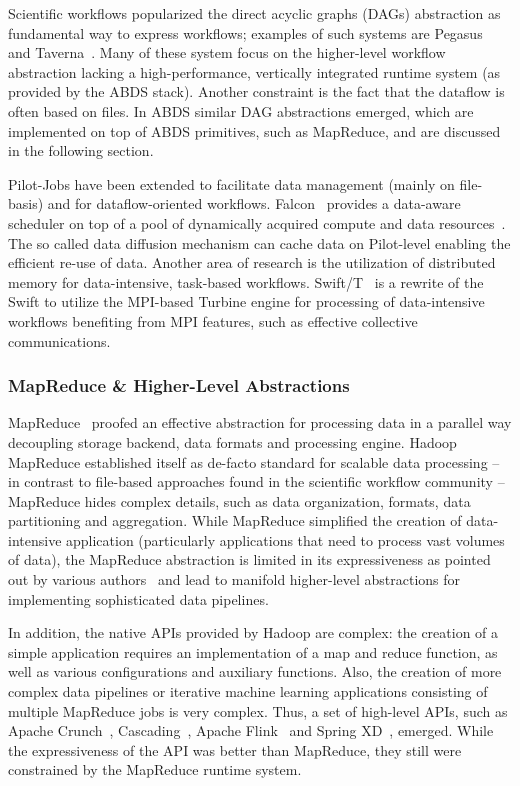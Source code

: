\documentclass{sig-alternate}
\newcommand{\pilot}{Pilot\xspace}
\newcommand{\pilotjobs}{Pilot-Jobs\xspace}
\begin{document}
Scientific workflows popularized the direct acyclic graphs (DAGs) abstraction
as fundamental way to express workflows; examples of such systems are
Pegasus~\cite{Deelman-FGCS-2014} and Taverna~\cite{Wolstencroft01072013}. Many
of these system focus on the higher-level workflow abstraction lacking a
high-performance, vertically integrated runtime system (as provided by the ABDS
stack). Another constraint is the fact that the dataflow is often based on
files. In ABDS similar DAG abstractions emerged, which are implemented on top
of ABDS primitives, such as MapReduce, and are discussed in the following
section.

\pilotjobs have been extended to facilitate data management (mainly on
file-basis) and for dataflow-oriented workflows. Falcon~\cite{1362680} provides
a data-aware scheduler on top of a pool of dynamically acquired compute and
data resources~\cite{Raicu:2008:ALD:1383519.1383521}. The so called data
diffusion mechanism can cache data on \pilot-level enabling the
efficient re-use of data. 
Another area of research is the utilization of distributed memory for
data-intensive, task-based workflows. Swift/T~\cite{10.1109/CCGrid.2013.99} is
a rewrite of the Swift to utilize the MPI-based Turbine engine for processing
of data-intensive workflows benefiting from MPI features, such as effective
collective communications.


\subsubsection*{MapReduce \& Higher-Level Abstractions} 

MapReduce~\cite{mapreduce} proofed an effective abstraction for processing data
in a parallel way decoupling storage backend, data formats and processing
engine. Hadoop MapReduce established itself as de-facto standard for scalable
data processing -- in contrast to file-based approaches found in the scientific
workflow community -- MapReduce hides complex details, such as data
organization, formats, data partitioning and aggregation. While MapReduce
simplified the creation of data-intensive application (particularly
applications that need to process vast volumes of data), the MapReduce
abstraction is limited in its expressiveness as pointed out by various
authors~\cite{magalan,dryad} and lead to manifold higher-level abstractions for
implementing sophisticated data pipelines.


In addition, the native APIs provided by Hadoop are complex: the creation of a
simple application requires an implementation of a map and reduce function, as
well as various configurations and auxiliary functions. Also, the creation of
more complex data pipelines or iterative machine learning applications
consisting of multiple MapReduce jobs is very complex. Thus, a set of
high-level APIs, such as Apache Crunch~\cite{crunch},
Cascading~\cite{cascading}, Apache Flink~\cite{flink} and Spring
XD~\cite{spring_xd}, emerged. While the expressiveness of the API was better
than MapReduce, they still were constrained by the MapReduce runtime system.
\end{document}
